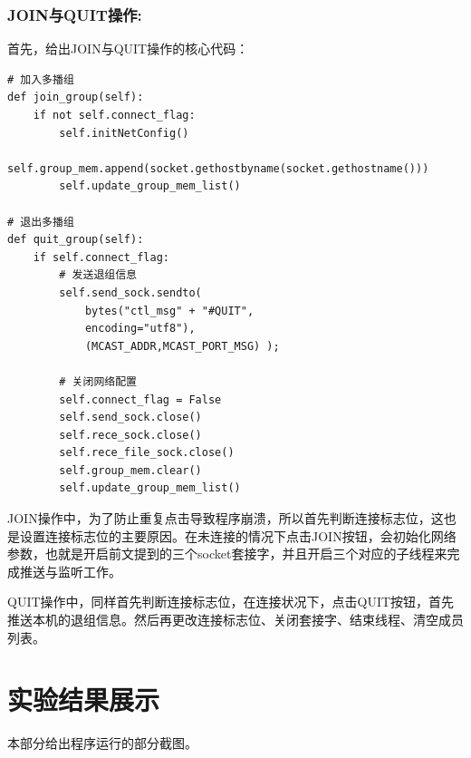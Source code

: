 \documentclass[UTF8]{ctexart}
\begin{document}
\subsubsection{JOIN与QUIT操作:}{首先，给出JOIN与QUIT操作的核心代码：}
\par{
\begin{lstlisting}
# 加入多播组
def join_group(self):
    if not self.connect_flag:
        self.initNetConfig()
        self.group_mem.append(socket.gethostbyname(socket.gethostname()))
        self.update_group_mem_list()

# 退出多播组
def quit_group(self):
    if self.connect_flag:
        # 发送退组信息
        self.send_sock.sendto(
        	bytes("ctl_msg" + "#QUIT", 
        	encoding="utf8"), 
        	(MCAST_ADDR,MCAST_PORT_MSG) );

        # 关闭网络配置
        self.connect_flag = False
        self.send_sock.close()
        self.rece_sock.close()
        self.rece_file_sock.close()
        self.group_mem.clear()
        self.update_group_mem_list()
\end{lstlisting}
}
\par{JOIN操作中，为了防止重复点击导致程序崩溃，所以首先判断连接标志位，这也是设置连接标志位的主要原因。在未连接的情况下点击JOIN按钮，会初始化网络参数，也就是开启前文提到的三个socket套接字，并且开启三个对应的子线程来完成推送与监听工作。
}
\par{QUIT操作中，同样首先判断连接标志位，在连接状况下，点击QUIT按钮，首先推送本机的退组信息。然后再更改连接标志位、关闭套接字、结束线程、清空成员列表。
}


\section{实验结果展示}
\par{本部分给出程序运行的部分截图。}
\end{document}
